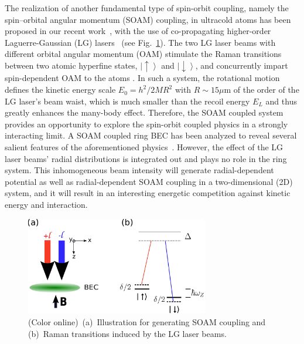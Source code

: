 \documentclass[twocolumn,pra,unsortedaddress,showpacs,floatfix,citeautoscript,nofootinbib]{revtex4-1}
\begin{document}
The realization of another fundamental type of spin-orbit
coupling, namely the spin--orbital angular momentum (SOAM)
coupling, in ultracold atoms has been proposed in our recent
work~\cite{Sun2014}, with the use of co-propagating higher-order
Laguerre-Gaussian (LG) lasers~\cite{Sun2014,Hu,Pu} (see
Fig.~\ref{ref-fig1}). The two LG laser beams with different
orbital angular momentum (OAM) stimulate the Raman transitions
between two atomic hyperfine states, $\left|\uparrow
\right\rangle$ and $\left|\downarrow\right\rangle$, and
concurrently impart spin-dependent OAM to the atoms
\cite{Marzlin1997,Juzeliunas2004,Cooper2010}. In such a system,
the rotational motion defines the kinetic energy scale
$E_{0}=h^{2}/2MR^{2}$ with $R\sim 15\mu$m of the order of the LG
laser's beam waist, which is much smaller than the recoil energy
$E_{L}$ and thus greatly enhances the many-body effect. Therefore,
the SOAM coupled system provides an opportunity to explore the
spin-orbit coupled physics in a strongly interacting limit. A SOAM
coupled ring BEC has been analyzed to reveal several salient
features of the aforementioned physics~\cite{Sun2014}. However,
the effect of the LG laser beams' radial distributions is
integrated out and plays no role in the ring system. This
inhomogeneous beam intensity will generate radial-dependent
potential as well as radial-dependent SOAM coupling in a
two-dimensional (2D) system, and it will result in an interesting
energetic competition against kinetic energy and interaction.


\begin{figure}[b]\vspace{-0.5cm}
\centering
\includegraphics[width=8cm]{Fig1.pdf}\vspace{-0.4cm}
\caption{(Color online)~(a)~Illustration for generating SOAM
coupling and (b)~Raman transitions induced by the LG laser beams.}
\vspace{-0.5cm} \label{ref-fig1}
\end{figure}
\end{document}
